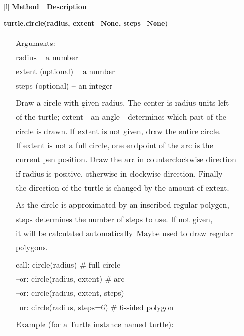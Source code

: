 \begin{center}
{\small
\begin{tabular}{|l|} \hline
{\bf Method~~Description}  \\ \hline\hline 


{\bf    turtle.circle(radius, extent=None, steps=None)} \\
   \begin{tabular}{p{0.25in}p{4in}}
&        Arguments: \\
&        radius -- a number \\
&        extent (optional) -- a number \\
&        steps (optional) -- an integer \\
&  \\
&        Draw a circle with given radius. The center is radius units left \\
&        of the turtle; extent - an angle - determines which part of the \\
&        circle is drawn. If extent is not given, draw the entire circle. \\
&        If extent is not a full circle, one endpoint of the arc is the \\
&        current pen position. Draw the arc in counterclockwise direction \\
&        if radius is positive, otherwise in clockwise direction. Finally \\
&        the direction of the turtle is changed by the amount of extent. \\
&  \\
&        As the circle is approximated by an inscribed regular polygon, \\
&        steps determines the number of steps to use. If not given, \\
&        it will be calculated automatically. Maybe used to draw regular \\
&        polygons. \\
&  \\
&        call: circle(radius)                  \# full circle \\
&        --or: circle(radius, extent)          \# arc \\
&        --or: circle(radius, extent, steps) \\
&        --or: circle(radius, steps=6)         \# 6-sided polygon \\
&  \\
&        Example (for a Turtle instance named turtle): \\

\end{tabular}
\end{tabular}}
\end{center}

